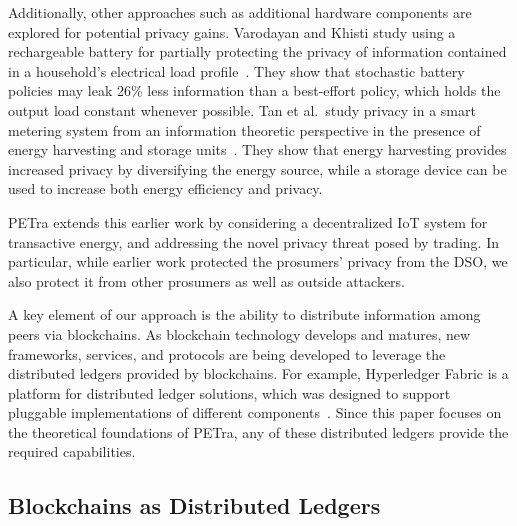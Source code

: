Additionally, other approaches such as additional hardware components
are explored for potential privacy gains. Varodayan and Khisti study
using a rechargeable battery for partially protecting the privacy of
information contained in a household's electrical load
profile~\cite{varodayan2011smart}. They show that stochastic battery
policies may leak 26\% less information than a best-effort policy,
which holds the output load constant whenever possible. Tan et
al.\ study privacy in a smart metering system from an information
theoretic perspective in the presence of energy harvesting and storage
units~\cite{tan2013increasing}. They show that energy harvesting
provides increased privacy by diversifying the energy source, while a
storage device can be used to increase both energy efficiency and
privacy.

PETra extends this earlier work by considering a decentralized
IoT system for transactive energy, and addressing the novel privacy
threat posed by trading. In particular, while earlier work
protected the prosumers' privacy from the DSO, we also protect it from
other prosumers as well as outside attackers.  

A key element of our approach is the ability to distribute information
among peers via blockchains.  As blockchain technology develops and
matures, new frameworks, services, and protocols are being developed
to leverage the distributed ledgers provided by blockchains. For example, Hyperledger
Fabric is a platform for distributed ledger solutions, which was
designed to support pluggable implementations of different
components~\cite{hyperledger2017fabric}. 
Since this paper focuses on
the theoretical foundations of PETra, any of these
distributed ledgers provide the required capabilities.


\iffalse
\subsection{Blockchains as Distributed Ledgers}

